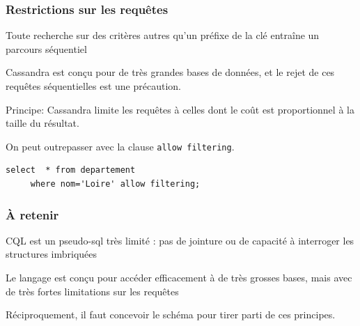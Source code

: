 \documentclass[aspectratio=169]{beamer} %
\begin{document}
\begin{frame}[fragile] \frametitle{Restrictions sur les requêtes}

Toute recherche sur des critères autres qu'un préfixe de la clé entraîne un parcours
séquentiel

\vfill

Cassandra est conçu pour de très grandes bases de données, et le rejet 
de ces requêtes séquentielles est une précaution. 

\vfill

Principe: Cassandra limite les requêtes à celles dont le coût est proportionnel à la 
taille du résultat.

\vfill

On peut outrepasser avec la clause \texttt{allow filtering}.
\begin{verbatim}
select  * from departement 
     where nom='Loire' allow filtering;
\end{verbatim}


\end{frame}



\begin{frame}[fragile]
\frametitle{À retenir}

\begin{redbullet}
   \item CQL est un pseudo-sql très limité : pas de jointure ou de capacité
       à interroger les structures imbriquées
   \item Le langage est conçu  pour accéder \alert{efficacement} à de très grosses
      bases, mais avec de très fortes limitations sur les requêtes
   \item Réciproquement, il faut concevoir le schéma pour tirer parti
   de ces principes.
\end{redbullet}
\end{frame}
\end{document}
